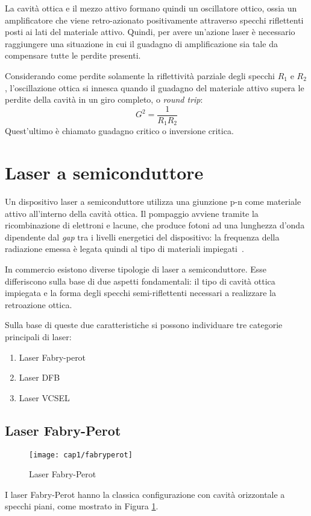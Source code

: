 La cavità ottica e il mezzo attivo formano quindi un oscillatore ottico, ossia un amplificatore che viene retro-azionato positivamente attraverso specchi riflettenti posti ai lati del materiale attivo. Quindi, per avere un'azione laser è necessario raggiungere una situazione in cui il guadagno di amplificazione sia tale da compensare tutte le perdite presenti. 

Considerando come perdite solamente la riflettività parziale degli specchi $R_1$ e $R_2$, l'oscillazione ottica si innesca quando il guadagno del materiale attivo supera le perdite della cavità in un giro completo, o \textit{round trip}:
\begin{equation}
  G^2=\frac{1}{R_1R_2}
\end{equation}
Quest'ultimo è chiamato guadagno critico o inversione critica.

\section{Laser a semiconduttore}
Un dispositivo laser a semiconduttore utilizza una giunzione p-n come materiale attivo all'interno della cavità ottica. Il pompaggio avviene tramite la ricombinazione di elettroni e lacune, che produce fotoni ad una lunghezza d'onda dipendente dal \textit{gap} tra i livelli energetici del dispositivo: la frequenza della radiazione emessa è legata quindi al tipo di materiali impiegati~\cite{sveltolaser}.

In commercio esistono diverse tipologie di laser a semiconduttore. Esse differiscono sulla base di due aspetti fondamentali: il tipo di cavità ottica impiegata e la forma degli specchi semi-riflettenti necessari a realizzare la retroazione ottica. 

Sulla base di queste due caratteristiche si possono individuare tre categorie principali di laser:
\begin{enumerate}
	\item Laser Fabry-perot
	\item Laser DFB
	\item Laser VCSEL
\end{enumerate}

\subsection{Laser Fabry-Perot}
\begin{figure}[H]
  \begin{center}
    \texttt{[image: cap1/fabryperot]}
    \caption{Laser Fabry-Perot}
    \label{fabryperot}
  \end{center}
\end{figure}
I laser Fabry-Perot hanno la classica configurazione con cavità orizzontale a specchi piani, come mostrato in Figura \ref{fabryperot}.

